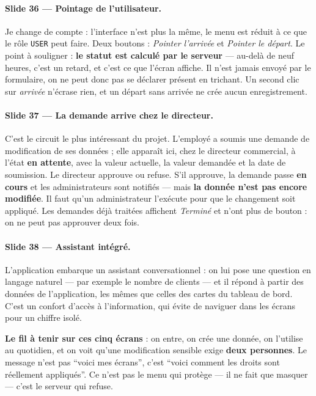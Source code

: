 \documentclass[a4paper,11pt]{article}
\begin{document}
\paragraph{Slide 36 --- Pointage de l'utilisateur.}
Je change de compte : l'interface n'est plus la même, le menu est réduit à ce
que le rôle \texttt{USER} peut faire. Deux boutons : \emph{Pointer l'arrivée} et
\emph{Pointer le départ}. Le point à souligner : \textbf{le statut est calculé
par le serveur} --- au-delà de neuf heures, c'est un retard, et c'est ce que
l'écran affiche. Il n'est jamais envoyé par le formulaire, on ne peut donc pas
se déclarer présent en trichant. Un second clic sur \emph{arrivée} n'écrase
rien, et un départ sans arrivée ne crée aucun enregistrement.

\paragraph{Slide 37 --- La demande arrive chez le directeur.}
C'est le circuit le plus intéressant du projet. L'employé a soumis une demande
de modification de ses données ; elle apparaît ici, chez le directeur
commercial, à l'état \textbf{en attente}, avec la valeur actuelle, la valeur
demandée et la date de soumission. Le directeur approuve ou refuse. S'il
approuve, la demande passe \textbf{en cours} et les administrateurs sont
notifiés --- mais \textbf{la donnée n'est pas encore modifiée}. Il faut qu'un
administrateur l'exécute pour que le changement soit appliqué. Les demandes déjà
traitées affichent \emph{Terminé} et n'ont plus de bouton : on ne peut pas
approuver deux fois.

\paragraph{Slide 38 --- Assistant intégré.}
L'application embarque un assistant conversationnel : on lui pose une question
en langage naturel --- par exemple le nombre de clients --- et il répond à
partir des données de l'application, les mêmes que celles des cartes du tableau
de bord. C'est un confort d'accès à l'information, qui évite de naviguer dans
les écrans pour un chiffre isolé.

\begin{coeur}
\textbf{Le fil à tenir sur ces cinq écrans} : on entre, on crée une donnée, on
l'utilise au quotidien, et on voit qu'une modification sensible exige
\textbf{deux personnes}. Le message n'est pas \enquote{voici mes écrans}, c'est
\enquote{voici comment les droits sont réellement appliqués}. Ce n'est pas le
menu qui protège --- il ne fait que masquer --- c'est le serveur qui refuse.
\end{coeur}
\end{document}
